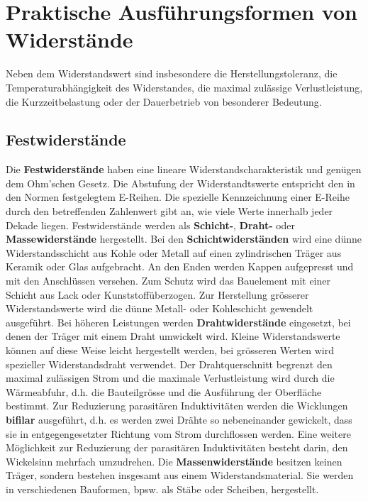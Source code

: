 \section{Praktische Ausführungsformen von Widerstände}
Neben dem Widerstandswert sind insbesondere die Herstellungstoleranz, die Temperaturabhängigkeit des Widerstandes, die maximal zulässige Verlustleistung, die Kurzzeitbelastung oder der Dauerbetrieb von besonderer Bedeutung.
\subsection{Festwiderstände}
Die \textbf{Festwiderstände} haben eine lineare Widerstandscharakteristik und genügen dem Ohm'schen Gesetz. Die Abstufung der Widerstandtswerte entspricht den in den Normen festgelegtem E-Reihen. Die spezielle Kennzeichnung einer E-Reihe durch den betreffenden Zahlenwert gibt an, wie viele Werte innerhalb jeder Dekade liegen. Festwiderstände werden als \textbf{Schicht-}, \textbf{Draht-} oder \textbf{Massewiderstände} hergestellt. 
\newline\newline
Bei den \textbf{Schichtwiderständen} wird eine dünne Widerstandsschicht aus Kohle oder Metall auf einen zylindrischen Träger aus Keramik oder Glas aufgebracht. An den Enden werden Kappen aufgepresst und mit den Anschlüssen versehen. Zum Schutz wird das Bauelement mit einer Schicht aus Lack oder Kunststoffüberzogen. Zur Herstellung grösserer Widerstandswerte wird die dünne Metall- oder Kohleschicht gewendelt ausgeführt. 
\newline\newline
Bei höheren Leistungen werden \textbf{Drahtwiderstände} eingesetzt, bei denen der Träger mit einem Draht umwickelt wird. Kleine Widerstandswerte können auf diese Weise leicht hergestellt werden, bei grösseren Werten wird spezieller Widerstandsdraht verwendet. Der Drahtquerschnitt begrenzt den maximal zulässigen Strom und die maximale Verlustleistung wird durch die Wärmeabfuhr, d.h. die Bauteilgrösse und die Ausführung der Oberfläche bestimmt. Zur Reduzierung parasitären Induktivitäten werden die Wicklungen \textbf{bifilar} ausgeführt, d.h. es werden zwei Drähte so nebeneinander gewickelt, dass sie in entgegengesetzter Richtung vom Strom durchflossen werden. Eine weitere Möglichkeit zur Reduzierung der parasitären Induktivitäten besteht darin, den Wickelsinn mehrfach umzudrehen.
\newline\newline
Die \textbf{Massenwiderstände} besitzen keinen Träger, sondern bestehen insgesamt aus einem Widerstandsmaterial. Sie werden in verschiedenen Bauformen, bpsw. als Stäbe oder Scheiben, hergestellt.
